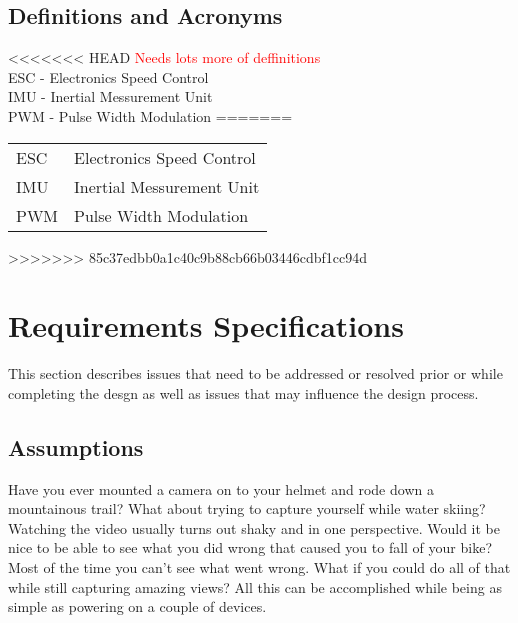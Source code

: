 \documentclass{article}
\numberwithin{equation}{section} %
\begin{document}
\subsection{Definitions and Acronyms}
<<<<<<< HEAD
\textcolor{red}{Needs lots more of deffinitions}\\
ESC - Electronics Speed Control\\
IMU - Inertial Messurement Unit\\
PWM - Pulse Width Modulation
=======
\begin{tabular}{l l}
	ESC & Electronics Speed Control \\
	IMU & Inertial Messurement Unit \\
	PWM & Pulse Width Modulation \\
\end{tabular}
>>>>>>> 85c37edbb0a1c40c9b88cb66b03446cdbf1cc94d



\section{Requirements Specifications}
This section describes issues that need to be addressed or resolved prior or while completing the desgn as well as issues that may influence the design process.


\subsection{Assumptions}
Have you ever mounted a camera on to your helmet and rode down a mountainous trail? What about trying to capture yourself while water skiing? Watching the video usually turns out shaky and in one perspective. Would it be nice to be able to see what you did wrong that caused you to fall of your bike? Most of the time you can't see what went wrong. What if you could do all of that while still capturing amazing views?  All this can be accomplished while being as simple as powering on a couple of devices. 


\end{document}
